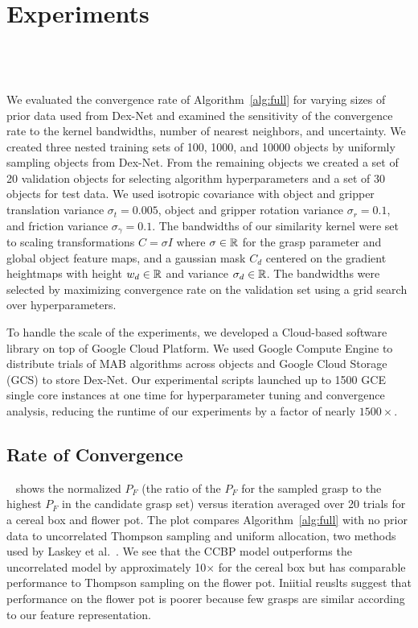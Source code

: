 \section{Experiments}

 \\
 \\
 \\

We evaluated the convergence rate of Algorithm~\ref{alg:full} for varying sizes of prior data used from Dex-Net and examined the sensitivity of the convergence rate to the kernel bandwidths, number of nearest neighbors, and uncertainty.
We created three nested training sets of 100, 1000, and 10000 objects by uniformly sampling objects from Dex-Net.
From the remaining objects we created a set of 20 validation objects for selecting algorithm hyperparameters and a set of 30 objects for test data.
We used isotropic covariance with object and gripper translation variance $\sigma_{t} = 0.005$, object and gripper rotation variance $\sigma_{r} = 0.1$, and friction variance $\sigma_{\gamma} = 0.1$.
The bandwidths of our similarity kernel were set to scaling transformations $C = \sigma I$ where $\sigma \in \mathbb{R}$ for the grasp parameter and global object feature maps, and a gaussian mask $C_d$ centered on the gradient heightmaps with height $w_d \in \mathbb{R}$ and variance $\sigma_d \in \mathbb{R}$.
The bandwidths were selected by maximizing convergence rate on the validation set using a grid search over hyperparameters.

To handle the scale of the experiments, we developed a Cloud-based software library on top of Google Cloud Platform.
We used Google Compute Engine to distribute trials of MAB algorithms across objects and Google Cloud Storage (GCS) to store Dex-Net.
Our experimental scripts launched up to 1500 GCE single core instances at one time for hyperparameter tuning and convergence analysis, reducing the runtime of our experiments by a factor of nearly $1500\times$.

\subsection{Rate of Convergence}

~ shows the normalized $P_F$ (the ratio of the $P_F$ for the sampled grasp to the highest $P_F$ in the candidate grasp set) versus iteration averaged over 20 trials for a cereal box and flower pot.
The plot compares Algorithm~\ref{alg:full} with no prior data to uncorrelated Thompson sampling and uniform allocation, two methods used by Laskey et al.~\cite{laskey2015bandits}.
We see that the CCBP model outperforms the uncorrelated model by approximately 10$\times$ for the cereal box but has comparable performance to Thompson sampling on the flower pot.
Iniitial reuslts suggest that performance on the flower pot is poorer because few grasps are similar according to our feature representation.

